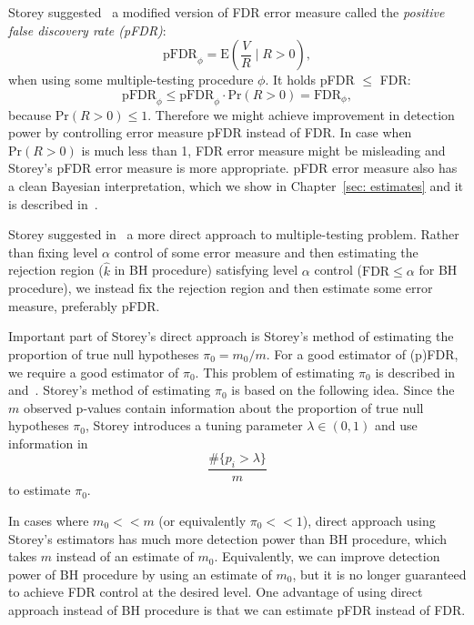 \documentclass[10pt]{article}
\begin{document}
Storey suggested~\cite{Storey} a modified version of FDR error measure called the {\it positive false discovery rate (pFDR)}:
\begin{equation}
\text{pFDR}_{\phi} = \text{E}\left( \frac{V}{R} \mid R > 0 \right),
\end{equation}
when using some multiple-testing procedure $\phi$. It holds pFDR $\leq$ FDR:
\begin{equation}
	\text{pFDR}_{\phi} \leq \text{pFDR}_{\phi} \cdot \text{Pr}(R > 0) = \text{FDR}_{\phi},
\end{equation} 
because $\text{Pr}(R > 0) \leq 1$. Therefore we might achieve improvement in detection power by controlling error measure pFDR instead of FDR. In case when $\text{Pr}(R > 0)$ is much less than 1, FDR error measure might be misleading and Storey's pFDR error measure is more appropriate. pFDR error measure also has a clean Bayesian interpretation, which we show in Chapter~\ref{sec: estimates} and it is described in~\cite{Bayesian}. 

Storey suggested in~\cite{Storey} a more direct approach to multiple-testing problem. Rather than fixing level $\alpha$ control of some error measure and then estimating the rejection region ($\hat{k}$ in BH procedure) satisfying level $\alpha$ control ($\text{FDR} \leq \alpha$ for BH procedure), we instead fix the rejection region and then estimate some error measure, preferably pFDR.

Important part of Storey's direct approach is Storey's method of estimating the proportion of true null hypotheses $\pi_{0} = m_{0} / m$. For a good estimator of (p)FDR, we require a good estimator of $\pi_{0}$. This problem of estimating $\pi_{0}$ is described in~\cite{Proportion1} and~\cite{Proportion2}. Storey's method of estimating $\pi_{0}$ is based on the following idea. Since the $m$ observed p-values contain information about the proportion of true null hypotheses $\pi_{0}$, Storey introduces a tuning parameter $\lambda \in (0, 1)$ and use information in 
\begin{equation}
	\frac{\# \lbrace p_{i} > \lambda \rbrace}{m}
\end{equation}
to estimate $\pi_{0}$. 

In cases where $m_{0} << m$ (or equivalently $\pi_{0} << 1$), direct approach using Storey's estimators has much more detection power than BH procedure, which takes $m$ instead of an estimate of $m_{0}$. Equivalently, we can improve detection power of BH procedure by using an estimate of $m_{0}$, but it is no longer guaranteed to achieve FDR control at the desired level. One advantage of using direct approach instead of BH procedure is that we can estimate pFDR instead of FDR. 
\end{document}
